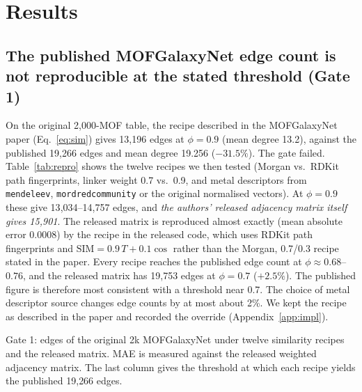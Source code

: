 \section{Results}
\label{sec:results}

\subsection{The published MOFGalaxyNet edge count is not reproducible at the stated threshold (Gate 1)}
\label{sec:res-repro}
On the original 2{,}000-MOF table, the recipe described in the MOFGalaxyNet paper (Eq.~\ref{eq:sim}) gives 13{,}196 edges at $\phi=0.9$ (mean degree 13.2), against the published 19{,}266 edges and mean degree 19.256 ($-31.5\%$). The gate failed. Table~\ref{tab:repro} shows the twelve recipes we then tested (Morgan vs.\ RDKit path fingerprints, linker weight 0.7 vs.\ 0.9, and metal descriptors from \texttt{mendeleev}, \texttt{mordredcommunity} \citep{moriwaki2018mordred} or the original normalised vectors). At $\phi=0.9$ these give 13{,}034--14{,}757 edges, and \emph{the authors' released adjacency matrix itself gives 15{,}901}. The released matrix is reproduced almost exactly (mean absolute error 0.0008) by the recipe in the released code, which uses RDKit path fingerprints and $\mathrm{SIM}=0.9\,T+0.1\cos$ rather than the Morgan, 0.7/0.3 recipe stated in the paper. Every recipe reaches the published edge count at $\phi\approx0.68$--$0.76$, and the released matrix has 19{,}753 edges at $\phi=0.7$ ($+2.5\%$). The published figure is therefore most consistent with a threshold near 0.7. The choice of metal descriptor source changes edge counts by at most about 2\%. We kept the recipe as described in the paper and recorded the override (Appendix~\ref{app:impl}).

\begin{table}[t]
\centering
\caption{Gate 1: edges of the original 2k MOFGalaxyNet under twelve similarity recipes and the released matrix. MAE is measured against the released weighted adjacency matrix. The last column gives the threshold at which each recipe yields the published 19{,}266 edges.}
\label{tab:repro}
\scriptsize
\begin{adjustbox}{max width=\textwidth}\end{adjustbox}
\end{table}

